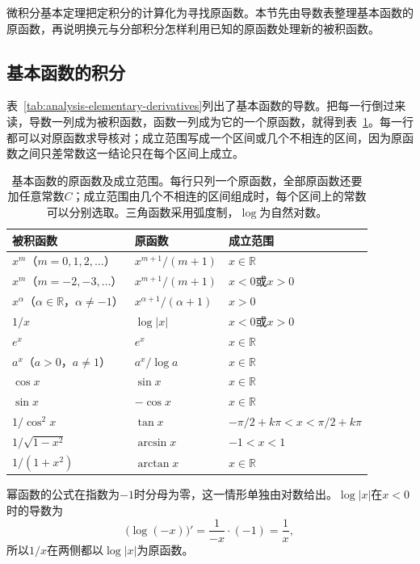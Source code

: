 微积分基本定理把定积分的计算化为寻找原函数。本节先由导数表整理基本函数的原函数，再说明换元与分部积分怎样利用已知的原函数处理新的被积函数。

\subsection{基本函数的积分}
\label{sec:ru-basic-antiderivatives}

表~\ref{tab:analysis-elementary-derivatives}列出了基本函数的导数。把每一行倒过来读，导数一列成为被积函数，函数一列成为它的一个原函数，就得到表~\ref{tab:ru-elementary-antiderivatives}。每一行都可以对原函数求导核对；成立范围写成一个区间或几个不相连的区间，因为原函数之间只差常数这一结论只在每个区间上成立。

\begin{table}[htbp]
 \centering\small
 \begin{tabular}{@{}lll@{}}
 \toprule
 被积函数 & 原函数 & 成立范围\\
 \midrule
 $x^m$（$m=0,1,2,\dots$） & $x^{m+1}/(m+1)$ & $x\in\mathbb R$\\
 $x^m$（$m=-2,-3,\dots$） & $x^{m+1}/(m+1)$ & $x<0$或$x>0$\\
 $x^\alpha$（$\alpha\in\mathbb R$，$\alpha\neq-1$） & $x^{\alpha+1}/(\alpha+1)$ & $x>0$\\
 $1/x$ & $\log|x|$ & $x<0$或$x>0$\\
 $e^x$ & $e^x$ & $x\in\mathbb R$\\
 $a^x$（$a>0$，$a\neq1$） & $a^x/\log a$ & $x\in\mathbb R$\\
 $\cos x$ & $\sin x$ & $x\in\mathbb R$\\
 $\sin x$ & $-\cos x$ & $x\in\mathbb R$\\
 $1/\cos^2x$ & $\tan x$ & $-\pi/2+k\pi<x<\pi/2+k\pi$\\
 $1/\sqrt{1-x^2}$ & $\arcsin x$ & $-1<x<1$\\
 $1/(1+x^2)$ & $\arctan x$ & $x\in\mathbb R$\\
 \bottomrule
 \end{tabular}
 \caption{基本函数的原函数及成立范围。每行只列一个原函数，全部原函数还要加任意常数$C$；成立范围由几个不相连的区间组成时，每个区间上的常数可以分别选取。三角函数采用弧度制，$\log$为自然对数。}
 \label{tab:ru-elementary-antiderivatives}
\end{table}

幂函数的公式在指数为$-1$时分母为零，这一情形单独由对数给出。$\log|x|$在$x<0$时的导数为
\[
 \bigl(\log(-x)\bigr)'=\frac1{-x}\cdot(-1)=\frac1x,
\]
所以$1/x$在两侧都以$\log|x|$为原函数。

